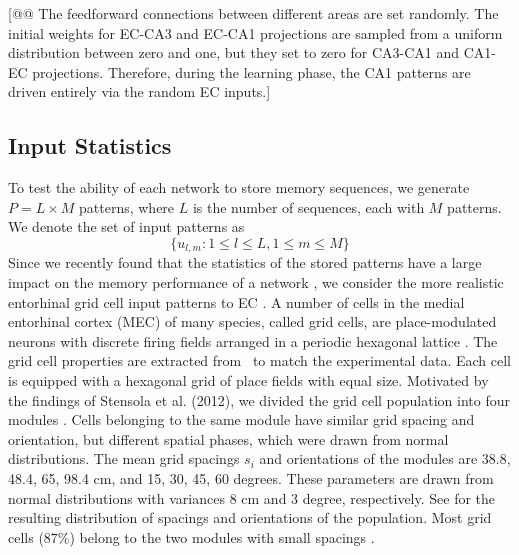 \documentclass[utf8]{frontiersSCNS} %
\begin{document}
[@@ The feedforward connections between different areas are set randomly. The initial weights for EC-CA3 and EC-CA1 projections are sampled from a uniform distribution between zero and one, but they set to zero for CA3-CA1 and CA1-EC projections. Therefore, during the learning phase, the CA1 patterns are driven entirely via the random EC inputs.]

\subsection{Input Statistics}

To test the ability of each network to store memory sequences, we generate $P = L \times M$ patterns, where $L$ is the number of sequences, each with $M$ patterns. We denote the set of input patterns as 
\begin{equation}
	\{ u_{l,m}: 1\le l \le L, 1\le m \le M \}
\end{equation}
Since we recently found that the statistics of the stored patterns have a large impact on the memory performance of a network \citep{neher2015memory}, we consider the more realistic entorhinal grid cell input patterns to EC \citep{hafting2005microstructure}. 
%
A number of cells in the medial entorhinal cortex (MEC) of many species, called grid cells, are place-modulated neurons with discrete firing fields arranged in a periodic hexagonal lattice \citep{hafting2005microstructure}.  
%
The grid cell properties are extracted from~\citep{stensola2012entorhinal} to match the experimental data.
Each cell is equipped with a hexagonal grid of place fields with equal size.
%
Motivated by the findings of Stensola et al. (2012), we divided the grid cell population into four modules \citep{stensola2012entorhinal}. Cells belonging to the same module have similar grid spacing and orientation, but different spatial phases, which were drawn from normal distributions. 
%
The mean grid spacings $s_i$ and orientations of the modules are 38.8, 48.4, 65, 98.4 cm, and 15, 30, 45, 60 degrees. These parameters are drawn from normal distributions with variances 8 cm and 3 degree, respectively.
%
See \citep[Fig 1B-1C]{neher2015memory} for the resulting distribution of spacings and orientations of the population.
%
Most grid cells ($87\%$) belong to the two modules with small spacings \citep{stensola2012entorhinal}. 
\end{document}
